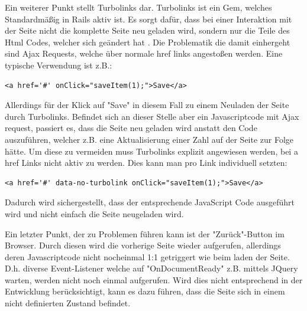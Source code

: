 Ein weiterer Punkt stellt Turbolinks dar. Turbolinks ist ein Gem, welches Standardmäßig in Rails aktiv ist. Es sorgt dafür, dass bei einer Interaktion mit der Seite nicht die komplette Seite neu geladen wird, sondern nur die Teile des Html Codes, welcher sich geändert hat \cite{Gamble.2013}. Die Problematik die damit einhergeht sind Ajax Requests, welche über normale href links angestoßen werden. Eine typische Verwendung ist z.B.:
\lstset{
   language=Html
}

\begin{lstlisting}[caption=a href HTML Code, label=code:ch5:html01]
<a href='#' onClick="saveItem(1);">Save</a>
\end{lstlisting}

Allerdings für der Klick auf "Save" in diesem Fall zu einem Neuladen der Seite durch Turbolinks. Befindet sich an dieser Stelle aber ein Javascriptcode mit Ajax request, passiert es, dass die Seite neu geladen wird anstatt den Code auszuführen, welcher z.B. eine Aktualisierung einer Zahl auf der Seite zur Folge hätte.
Um diese zu vermeiden muss Turbolinks explizit angewiesen werden, bei a href Links nicht aktiv zu werden. Dies kann man pro Link individuell setzten:

\begin{lstlisting}[caption=a href HTML Code - Turbolinks deaktiviert, label=code:ch5:html01]
<a href='#' data-no-turbolink onClick="saveItem(1);">Save</a>
\end{lstlisting}

Dadurch wird sichergestellt, dass der entsprechende JavaScript Code ausgeführt wird und nicht einfach die Seite neugeladen wird.

Ein letzter Punkt, der zu Problemen führen kann ist der "Zurück"-Button im Browser.
Durch diesen wird die vorherige Seite wieder aufgerufen, allerdings deren Javascriptcode nicht nocheinmal 1:1 getriggert wie beim laden der Seite. D.h. diverse Event-Listener welche auf "OnDocumentReady" z.B. mittels JQuery warten, werden nicht noch einmal aufgerufen. Wird dies nicht entsprechend in der Entwicklung berücksichtigt, kann es dazu führen, dass die Seite sich in einem nicht definierten Zustand befindet.
